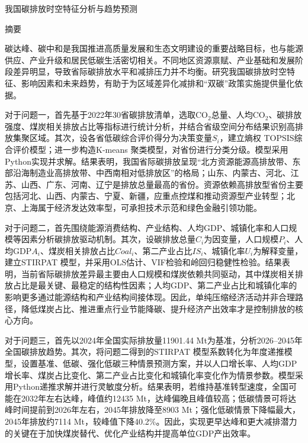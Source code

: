 \documentclass[UTF8,zihao=-4,fontset=windows]{ctexart}
\begin{document}


\clearpage
\setcounter{page}{1}

\begin{center}
{\heiti{} 我国碳排放时空特征分析与趋势预测}
\end{center}

\begin{center}
{\heiti{} 摘要}
\end{center}

碳达峰、碳中和是我国推进高质量发展和生态文明建设的重要战略目标，也与能源供应、产业升级和居民低碳生活密切相关。不同地区资源禀赋、产业基础和发展阶段差异明显，导致省际碳排放水平和减排压力并不均衡。研究我国碳排放时空特征、影响因素和未来趋势，有助于为区域差异化减排和“双碳”政策实施提供量化依据。

{\heiti 对于问题一}，首先基于2022年30省碳排放清单，选取CO$_2$总量、人均CO$_2$、碳排放强度、煤炭相关排放占比等指标进行统计分析，并结合省级空间分布结果识别高排放集聚区域。其次，设各省低碳综合评价得分为决策变量$S_i$，建立{\heiti 熵权 TOPSIS}综合评价模型；进一步构造{\heiti K-means 聚类}模型，对省份进行分类分级。模型采用Python实现并求解。结果表明，我国省际碳排放呈现“北方资源能源高排放带、东部沿海制造业高排放带、中西南相对低排放区”的格局；山东、内蒙古、河北、江苏、山西、广东、河南、辽宁是排放总量最高的省份。资源依赖高排放型省份主要包括河北、山西、内蒙古、宁夏、新疆，应重点控煤和推动资源型产业转型；北京、上海属于经济发达效率型，可承担技术示范和绿色金融引领功能。

{\heiti 对于问题二}，首先围绕能源消费结构、产业结构、人均GDP、城镇化率和人口规模等因素分析碳排放驱动机制。其次，设碳排放总量$C_i$为因变量，人口规模$P_i$、人均GDP$A_i$、煤炭相关排放占比$Coal_i$、第二产业占比$IS_i$、城镇化率$U_i$为解释变量，建立{\heiti STIRPAT 模型}，并采用{\heiti OLS}估计、{\heiti VIF}检验和{\heiti 岭回归}稳健性检验。结果表明，当前省际碳排放差异最主要由人口规模和煤炭依赖共同驱动，其中煤炭相关排放占比是最关键、最稳定的结构性因素；人均GDP、第二产业占比和城镇化率的影响更多通过能源结构和产业结构间接体现。因此，单纯压缩经济活动并非合理路径，降低煤炭占比、推进重点行业节能降碳、提升经济产出效率才是控制排放的核心方向。

{\heiti 对于问题三}，首先以2024年全国实际排放量11901.44 Mt为基准，分析2026--2045年全国碳排放趋势。其次，将问题二得到的{\heiti STIRPAT 模型}系数转化为年度递推模型，设置基准、低碳、强化低碳三种{\heiti 情景预测}方案，并以人口增长率、人均GDP增长率、煤炭占比变化、第二产业占比变化和城镇化率变化作为情景参数。模型采用Python递推求解并进行灵敏度分析。结果表明，若维持基准转型速度，全国可能在2032年左右达峰，峰值约12435 Mt，达峰偏晚且峰值较高；低碳情景可将达峰时间提前到2026年左右，2045年排放降至8903 Mt；强化低碳情景下降幅最大，2045年排放约7114 Mt，较峰值下降40.2\%。因此，实现更早达峰和更大减排潜力的关键在于加快煤炭替代、优化产业结构并提高单位GDP产出效率。
\end{document}
